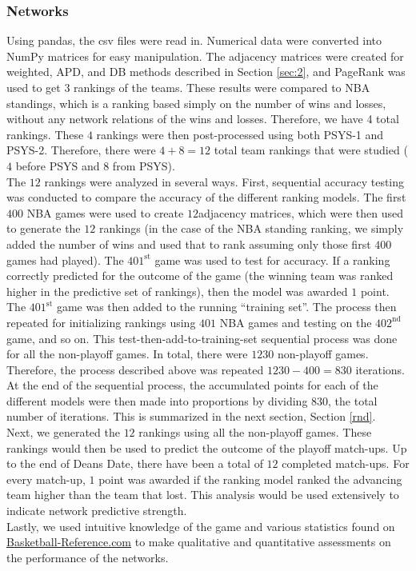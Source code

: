 \documentclass[12pt]{article}%
\begin{document}
\subsubsection{Networks}
\label{teamimp_networks}
\null\quad\quad Using pandas, the csv files were read in. Numerical data were converted into NumPy matrices for easy manipulation. The adjacency matrices were created for weighted, APD, and DB methods described in Section \ref{sec:2}, and PageRank was used to get $3$ rankings of the teams. These results were compared to NBA standings, which is a ranking based simply on the number of wins and losses, without any network relations of the wins and losses. Therefore, we have 4 total rankings. These $4$ rankings were then post-processed using both PSYS-1 and PSYS-2. Therefore, there were $4+8=12$ total team rankings that were studied ($4$ before PSYS and $8$ from PSYS).\\
\null\quad\quad The $12$ rankings were analyzed in several ways. First, sequential accuracy testing was conducted to compare the accuracy of the different ranking models. The first $400$ NBA games were used to create $12 $adjacency matrices, which were then used to generate the $12$ rankings (in the case of the NBA standing ranking, we simply added the number of wins and used that to rank assuming only those first $400$ games had played). The $401^{\text{st}}$ game was used to test for accuracy. If a ranking correctly predicted for the outcome of the game (the winning team was ranked higher in the predictive set of rankings), then the model was awarded $1$ point. The $401^{\text{st}}$ game was then added to the running ``training set''. The process then repeated for initializing rankings using $401$ NBA games and testing on the $402^{\text{nd}}$ game, and so on. This test-then-add-to-training-set sequential process was done for all the non-playoff games. In total, there were $1230$ non-playoff games. Therefore, the process described above was repeated $1230-400=830$ iterations. At the end of the sequential process, the accumulated points for each of the different models were then made into proportions by dividing $830$, the total number of iterations. This is summarized in the next section, Section \ref{rnd}.\\
\null\quad\quad Next, we generated the $12$ rankings using all the non-playoff games. These rankings would then be used to predict the outcome of the playoff match-ups. Up to the end of Deans Date, there have been a total of $12$ completed match-ups. For every match-up, $1$ point was awarded if the ranking model ranked the advancing team higher than the team that lost. This analysis would be used extensively to indicate network predictive strength.\\
\null\quad\quad Lastly, we used intuitive knowledge of the game and various statistics found on \href{https://www.basketball-reference.com/}{Basketball-Reference.com} to make qualitative and quantitative assessments on the performance of the networks.
\end{document}
